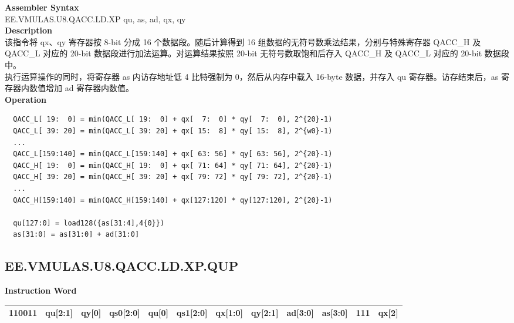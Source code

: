 \textbf{Assembler Syntax} \\
EE.VMULAS.U8.QACC.LD.XP qu, as, ad, qx, qy \\
\textbf{Description} \\
该指令将 qx、qy 寄存器按 8-bit 分成 16 个数据段。随后计算得到 16 组数据的无符号数乘法结果，分别与特殊寄存器 QACC\_H 及 QACC\_L 对应的 20-bit 数据段进行加法运算。对运算结果按照 20-bit 无符号数取饱和后存入 QACC\_H 及 QACC\_L 对应的 20-bit 数据段中。\\
执行运算操作的同时，将寄存器 as 内访存地址低 4 比特强制为 0，然后从内存中载入 16-byte 数据，并存入 qu 寄存器。访存结束后，as 寄存器内数值增加 ad 寄存器内数值。\\
\textbf{Operation}
\begin{lstlisting}
  QACC_L[ 19:  0] = min(QACC_L[ 19:  0] + qx[  7:  0] * qy[  7:  0], 2^{20}-1)
  QACC_L[ 39: 20] = min(QACC_L[ 39: 20] + qx[ 15:  8] * qy[ 15:  8], 2^{w0}-1)
  ...
  QACC_L[159:140] = min(QACC_L[159:140] + qx[ 63: 56] * qy[ 63: 56], 2^{20}-1)
  QACC_H[ 19:  0] = min(QACC_H[ 19:  0] + qx[ 71: 64] * qy[ 71: 64], 2^{20}-1)
  QACC_H[ 39: 20] = min(QACC_H[ 39: 20] + qx[ 79: 72] * qy[ 79: 72], 2^{20}-1)
  ...
  QACC_H[159:140] = min(QACC_H[159:140] + qx[127:120] * qy[127:120], 2^{20}-1)

  qu[127:0] = load128({as[31:4],4{0}})
  as[31:0] = as[31:0] + ad[31:0]
\end{lstlisting}

\clearpage
\subsection{EE.VMULAS.U8.QACC.LD.XP.QUP}\label{instruction:EEVMULASU8QACCLDXPQUP}
\setlength\tabcolsep{6pt}
\textbf{Instruction Word} \\
\begin{tabular}{|c|c|c|c|c|c|c|c|c|c|c|c|}
	\hline
	110011 & qu[2:1] & qy[0] & qs0[2:0] & qu[0] & qs1[2:0] & qx[1:0] & qy[2:1] & ad[3:0] & as[3:0] & 111 & qx[2] \\
	\hline
\end{tabular}

